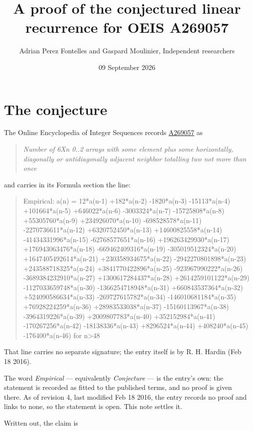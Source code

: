 \documentclass[11pt]{article}
\title{A proof of the conjectured linear recurrence for OEIS A269057}
\author{Adrian Perez Fontelles and Gaspard Moulinier, Independent researchers}
\date{09 September 2026}
\theoremstyle{definition}
\begin{document}
\maketitle
\section{The conjecture}

The Online Encyclopedia of Integer Sequences records \href{https://oeis.org/A269057}{A269057} as

\begin{quote}\itshape Number of 6Xn 0..2 arrays with some element plus some horizontally, diagonally or antidiagonally adjacent neighbor totalling two not more than once\end{quote}

and carries in its Formula section the line:

\begin{quote}\ttfamily Empirical: a(n) = 12*a(n-1) +182*a(n-2) -1820*a(n-3) -15113*a(n-4) +101664*a(n-5) +646022*a(n-6) -3003324*a(n-7) -15725808*a(n-8) +55305760*a(n-9) +234926070*a(n-10) -698528578*a(n-11) -2270736611*a(n-12) +6320752450*a(n-13) +14600825558*a(n-14) -41434331996*a(n-15) -62768577651*a(n-16) +196263429930*a(n-17) +176943063476*a(n-18) -669462409316*a(n-19) -305019512324*a(n-20) +1647405492614*a(n-21) +230358934675*a(n-22) -2942270801898*a(n-23) +243588718325*a(n-24) +3841770422896*a(n-25) -923967990222*a(n-26) -3689384232910*a(n-27) +1300617284437*a(n-28) +2614259101122*a(n-29) -1127033659748*a(n-30) -1366254718948*a(n-31) +660843537364*a(n-32) +524090586634*a(n-33) -269727615782*a(n-34) -146010681184*a(n-35) +76928224259*a(n-36) +28983533038*a(n-37) -15160113967*a(n-38) -3964319226*a(n-39) +2009807783*a(n-40) +352152984*a(n-41) -170267256*a(n-42) -18138336*a(n-43) +8296524*a(n-44) +408240*a(n-45) -176400*a(n-46) for n>48\end{quote}

That line carries no separate signature; the entry itself is by R. H. Hardin (Feb 18 2016).

The word {\itshape Empirical} --- equivalently {\itshape Conjecture} --- is the entry's own: the statement is recorded as fitted to the published terms, and no proof is given there. As of revision 4, last modified Feb 18 2016, the entry records no proof and links to none, so the statement is open. This note settles it.

Written out, the claim is
\end{document}
